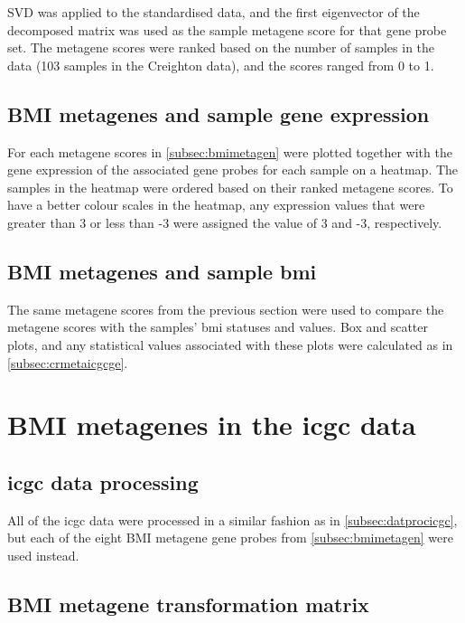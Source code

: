 SVD was applied to the standardised data, and the first eigenvector of the decomposed matrix was used as the sample metagene score for that gene probe set.
The \gls{metagene} scores were ranked based on the number of samples in the data (103 samples in the Creighton data), and the scores ranged from 0 to 1.

\subsection{BMI metagenes and sample gene expression}
\label{subsec:bmimetavscr}

For each \gls{metagene} scores in \cref{subsec:bmimetagen} were plotted together with the gene expression of the associated gene probes for each sample on a heatmap.
The samples in the heatmap were ordered based on their ranked \gls{metagene} scores.
To have a better colour scales in the heatmap, any expression values that were greater than 3 or less than -3 were assigned the value of 3 and -3, respectively.

\subsection{BMI metagenes and sample \gls{bmi}}
\label{subsec:bmidegmetacr}

The same \gls{metagene} scores from the previous section were used to compare the \gls{metagene} scores with the samples' \gls{bmi} statuses and values.
Box and scatter plots, and any statistical values associated with these plots were calculated as in \cref{subsec:crmetaicgcge}.

\section{BMI metagenes in the \gls{icgc} data}
\label{sec:bmidegmetaicgc}

\subsection{\gls{icgc} data processing}

All of the \gls{icgc} data were processed in a similar fashion as in \cref{subsec:datprocicgc}, but each of the eight BMI metagene gene probes from \cref{subsec:bmimetagen} were used instead.

\subsection{BMI metagene transformation matrix}
\label{subsec:bmimetagenicgc}

